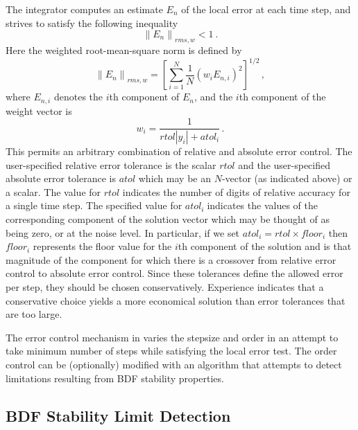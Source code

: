 The integrator computes an estimate $E_{n}$ of the local error at each time
step, and strives to satisfy the following inequality
\begin{equation*}%
\left\| E_n\right\|_{rms,w} < 1 ~.
\end{equation*}
Here the weighted root-mean-square norm is defined by
\begin{equation}\label{e:rms}
\left\| E_n\right\|_{rms,w}=\left[ \sum_{i=1}^N\frac{1}{N}\left(
w_iE_{n,i}\right) ^2\right] ^{1/2} \, ,
\end{equation}
where $E_{n,i}$ denotes the $i$th component of $E_n$, and the $i$th 
component of the weight vector is 
\begin{equation}\label{e:weight}
w_i=\frac{1}{rtol|y_i|+atol_i} \,.
\end{equation}
This permits an arbitrary combination of relative and absolute error control.
The user-specified relative error tolerance is the scalar $rtol$ and the
user-specified absolute error tolerance is $atol$ which may be an $N$-vector
(as indicated above) or a scalar. The value for $rtol$
indicates the number of digits of relative accuracy for a single time step.
The specified value for $atol_{i}\;$indicates the values of the
corresponding component of the solution vector which may be thought of as
being zero, or at the noise level. In particular, if we set 
$atol_i=rtol\times floor_i$ then $floor_i$ represents the floor value for the 
$i$th component of the solution and is that magnitude of the component for
which there is a crossover from relative error control to absolute error
control. Since these tolerances define the allowed error per step, they
should be chosen conservatively. Experience indicates that a conservative
choice yields a more economical solution than error tolerances that are too
large.

The error control mechanism in {\cvode} varies the stepsize and order
in an attempt to take minimum number of steps while satisfying the local
error test. The order control can be (optionally) modified with an algorithm
that attempts to detect limitations resulting from BDF stability properties.


\subsection{BDF Stability Limit Detection}

